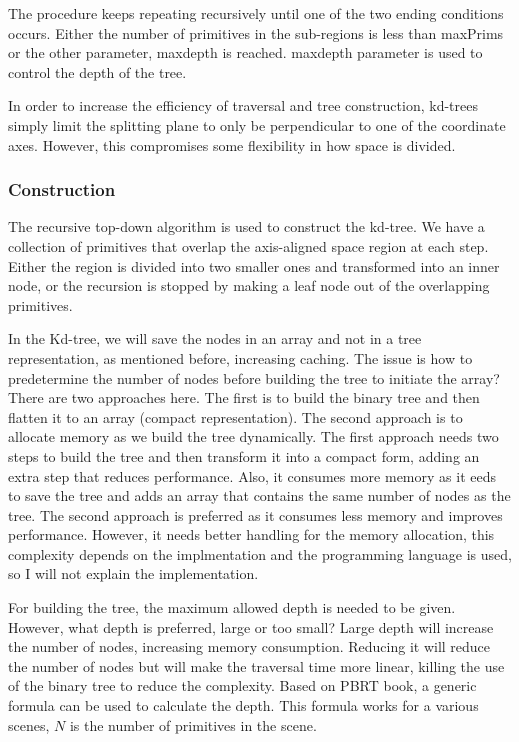 \documentclass[11pt,a4paper]{article}
\begin{document}
The procedure keeps repeating recursively until one of the two ending conditions occurs. Either the number of primitives in the sub-regions is less than maxPrims or the other parameter, maxdepth is reached. maxdepth parameter is used to control the depth of the tree. 

In order to increase the efficiency of traversal and tree construction, kd-trees simply limit the splitting plane to only be perpendicular to one of the coordinate axes. However, this compromises some flexibility in how space is divided.

\subsubsection{Construction}

The recursive top-down algorithm is used to construct the kd-tree. We have a collection of primitives that overlap the axis-aligned space region at each step. Either the region is divided into two smaller ones and transformed into an inner node, or the recursion is stopped by making a leaf node out of the overlapping primitives.

In the Kd-tree, we will save the nodes in an array and not in a tree representation, as mentioned before, increasing caching. The issue is how to predetermine the number of nodes before building the tree to initiate the array? There are two approaches here. The first is to build the binary tree and then flatten it to an array (compact representation). The second approach is to allocate memory as we build the tree dynamically. The first approach needs two steps to build the tree and then transform it into a compact form, adding an extra step that reduces performance. Also, it consumes more memory as it eeds to save the tree and adds an array that contains the same number of nodes as the tree. The second approach is preferred as it consumes less memory and improves performance. However, it needs better handling for the memory allocation, this complexity depends on the implmentation and the programming language is used, so I will not explain the implementation. 

For building the tree, the maximum allowed depth is needed to be given. However, what depth is preferred, large or too small? Large depth will increase the number of nodes, increasing memory consumption. Reducing it will reduce the number of nodes but will make the traversal time more linear, killing the use of the binary tree to reduce the complexity. Based on  PBRT book, a generic formula can be used to calculate the depth. This formula works for a various scenes, $N$ is the number of primitives in the scene. 
\end{document}
